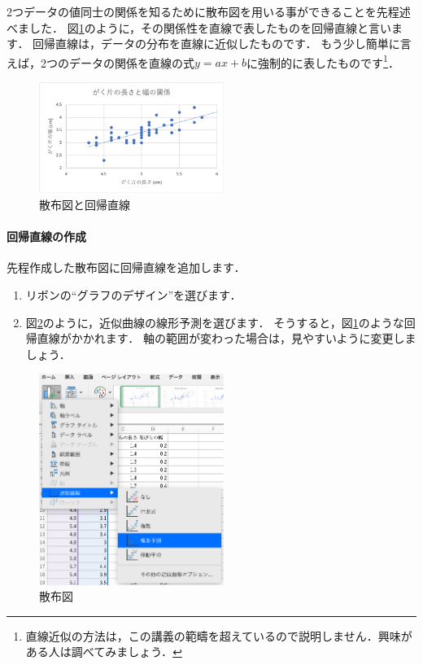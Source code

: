 2つデータの値同士の関係を知るために散布図を用いる事ができることを先程述べました．
図\ref{fig:regression}のように，その関係性を直線で表したものを回帰直線と言います．
回帰直線は，データの分布を直線に近似したものです．
もう少し簡単に言えば，2つのデータの関係を直線の式$y=ax+b$に強制的に表したものです\footnote{直線近似の方法は，この講義の範疇を超えているので説明しません．興味がある人は調べてみましょう．}．

\begin{figure}[htbp]
    \centering
    \includegraphics[width=6cm]{chap2/regression.png}
    \caption{散布図と回帰直線}
    \label{fig:regression}
\end{figure}

\paragraph{回帰直線の作成}

先程作成した散布図に回帰直線を追加します．

\begin{enumerate}
    \item リボンの``グラフのデザイン''を選びます．
    \item 図\ref{fig:regression_menu}のように，近似曲線の線形予測を選びます．
    そうすると，図\ref{fig:regression}のような回帰直線がかかれます．
    軸の範囲が変わった場合は，見やすいように変更しましょう．
\end{enumerate}

\begin{figure}[htbp]
    \centering
    \includegraphics[width=6cm]{chap2/regression_menu.png}
    \caption{散布図}
    \label{fig:regression_menu}
\end{figure}

